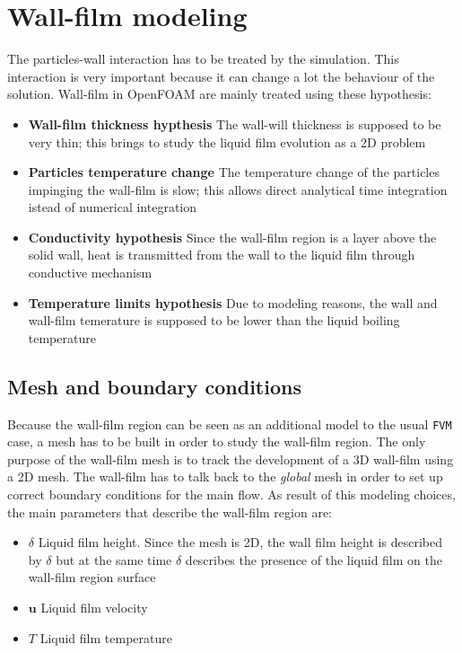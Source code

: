 \section{Wall-film modeling} \label{app:app3_2}
    The particles-wall interaction has to be treated by the simulation. This interaction is very important because it can change a lot the behaviour of the solution. Wall-film in OpenFOAM are mainly treated using these hypothesis:
    \begin{itemize}
        \item \textbf{Wall-film thickness hypthesis} The wall-will thickness is supposed to be very thin; this brings to study the liquid film evolution as a 2D problem
        \item \textbf{Particles temperature change} The temperature change of the particles impinging the wall-film is slow; this allows direct analytical time integration istead of numerical integration
        \item \textbf{Conductivity hypothesis} Since the wall-film region is a layer above the solid wall, heat is transmitted from the wall to the liquid film through conductive mechanism
        \item \textbf{Temperature limits hypothesis} Due to modeling reasons, the wall and wall-film temerature is supposed to be lower than the liquid boiling temperature
    \end{itemize}

\subsection{Mesh and boundary conditions}
    Because the wall-film region can be seen as an additional model to the usual \verb|FVM| case, a mesh has to be built in order to study the wall-film region. The only purpose of the wall-film mesh is to track the development of a 3D wall-film using a 2D mesh. The wall-film has to talk back to the \textit{global} mesh in order to set up correct boundary conditions for the main flow. As result of this modeling choices, the main parameters that describe the wall-film region are:
    \begin{itemize}
        \item $\delta$ Liquid film height. Since the mesh is 2D, the wall film height is described by $\delta$ but at the same time $\delta$ describes the presence of the liquid film on the wall-film region surface
        \item $\boldsymbol{u}$ Liquid film velocity
        \item $T$ Liquid film temperature
    \end{itemize}
    
